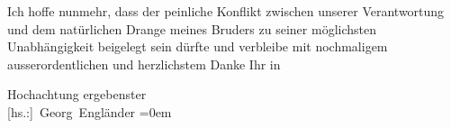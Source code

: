 \pstart
           Ich hoffe nunmehr, dass der peinliche Konflikt zwischen unserer Verantwortung und dem
               natürlichen Drange meines Bruders zu seiner möglichsten Unabhängigkeit beigelegt sein dürfte und
               verbleibe mit nochmaligem ausserordentlichen und herzlichstem Danke Ihr in\pend
           
\pstart
           Hochachtung ergebenster{\\[\baselineskip]}\spacefill\mbox{{[}hs.:{]} Georg Engländer}\pend
           \leftskip=0em{}\endnumbering{}  
      